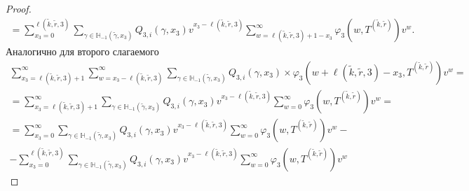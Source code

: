 \documentclass[a4paper,12pt,russian]{extarticle}
\begin{document}
\begin{proof}
\begin{multline}
=\sum_{x_3=0}^{\ell(\tilde{k},\tilde{r},3)}  \sum_{\gamma \in {\mathbb H}_{-1}(\tilde{\gamma},x_3)} Q_{3,i}(\gamma,x_3) v^{x_3-\ell(\tilde{k},\tilde{r},3)}  \sum_{w=\ell(\tilde{k},\tilde{r},3) + 1 -x_3}^{\infty}
\varphi_3(w,T^{(\tilde{k},\tilde{r})}) v^w.
\label{sum:one}
\end{multline}
Аналогично для второго слагаемого
\begin{multline}
 \sum_{x_3=\ell(\tilde{k},\tilde{r},3) + 1}^{\infty}\sum_{w=x_3-\ell(\tilde{k},\tilde{r},3)}^{\infty} \sum_{\gamma \in {\mathbb H}_{-1}(\tilde{\gamma},x_3)} Q_{3,i}(\gamma,x_3) \times 
\varphi_3(w + \ell(\tilde{k},\tilde{r},3) - x_3,T^{(\tilde{k},\tilde{r})}) v^w = \\
=  \sum_{x_3=\ell(\tilde{k},\tilde{r},3) + 1}^{\infty} \sum_{\gamma \in {\mathbb H}_{-1}(\tilde{\gamma},x_3)} Q_{3,i}(\gamma,x_3) v^{x_3-\ell(\tilde{k},\tilde{r},3)}\sum_{w=0}^{\infty}  
\varphi_3(w,T^{(\tilde{k},\tilde{r})}) v^w = \\
= \sum_{x_3=0}^{\infty} \sum_{\gamma \in {\mathbb H}_{-1}(\tilde{\gamma},x_3)} Q_{3,i}(\gamma,x_3) v^{x_3-\ell(\tilde{k},\tilde{r},3)}\sum_{w=0}^{\infty} 
\varphi_3(w,T^{(\tilde{k},\tilde{r})}) v^w - \\
- \sum_{x_3=0}^{\ell(\tilde{k},\tilde{r},3)} \sum_{\gamma \in {\mathbb H}_{-1}(\tilde{\gamma},x_3)} Q_{3,i}(\gamma,x_3) v^{x_3-\ell(\tilde{k},\tilde{r},3)}\sum_{w=0}^{\infty}
\varphi_3(w,T^{(\tilde{k},\tilde{r})}) v^w
\label{sum:two}
\end{multline}


\end{proof}
\end{document}
